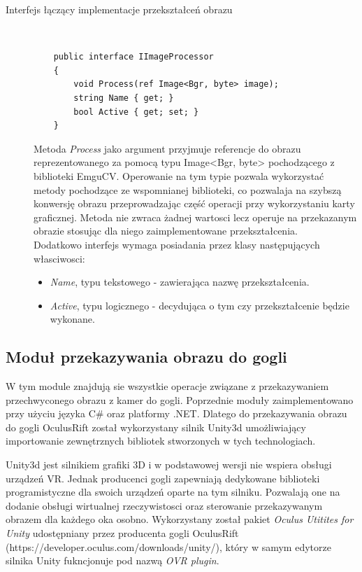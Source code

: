 \documentclass[a4paper,11pt,twoside]{report}
\theoremstyle{definition}
\begin{document}
\begin{description}
\item [Interfejs łączący implementacje przekształceń obrazu] \hfill \\
\lstset{style=sharpc}
\begin{lstlisting}
    public interface IImageProcessor
    {
        void Process(ref Image<Bgr, byte> image);
        string Name { get; }
        bool Active { get; set; }
    }
\end{lstlisting}

Metoda \textit{Process} jako argument przyjmuje referencje do obrazu reprezentowanego za pomocą typu Image<Bgr, byte> pochodzącego z biblioteki EmguCV. Operowanie na tym typie pozwala wykorzystać metody pochodzące ze wspomnianej biblioteki, co pozwalaja na szybszą konwersję obrazu przeprowadzając część operacji przy wykorzystaniu karty graficznej. Metoda nie zwraca żadnej wartosci lecz operuje na przekazanym obrazie stosując dla niego zaimplementowane przekształcenia.  \\
Dodatkowo interfejs wymaga posiadania przez klasy następujących własciwosci:
\begin{itemize}
\item  \textit{Name}, typu tekstowego - zawierająca nazwę przekształcenia.
\item \textit{Active}, typu logicznego -  decydująca o tym czy przekształcenie będzie wykonane.
\end{itemize}

\end{description}

\subsection {Moduł przekazywania obrazu do gogli}

W tym module znajdują sie wszystkie operacje związane z przekazywaniem przechwyconego obrazu z kamer do gogli. Poprzednie moduły zaimplementowano przy użyciu języka C\# oraz  platformy .NET. Dlatego do przekazywania obrazu do gogli OculusRift został wykorzystany silnik Unity3d umożliwiający importowanie zewnętrznych bibliotek stworzonych w tych technologiach.

Unity3d jest silnikiem grafiki 3D i w podstawowej wersji nie wspiera obsługi urządzeń VR. Jednak producenci gogli zapewniają dedykowane biblioteki programistyczne dla swoich urządzeń oparte na tym silniku. Pozwalają one na dodanie obsługi wirtualnej rzeczywistosci oraz sterowanie przekazywanym obrazem dla każdego oka osobno. Wykorzystany został pakiet \textit{Oculus Utitites for Unity} udostępniany przez producenta gogli OculusRift (https://developer.oculus.com/downloads/unity/), który w samym edytorze silnika Unity fukncjonuje pod nazwą \textit{OVR plugin}.  \hfill \\
\end{document}

